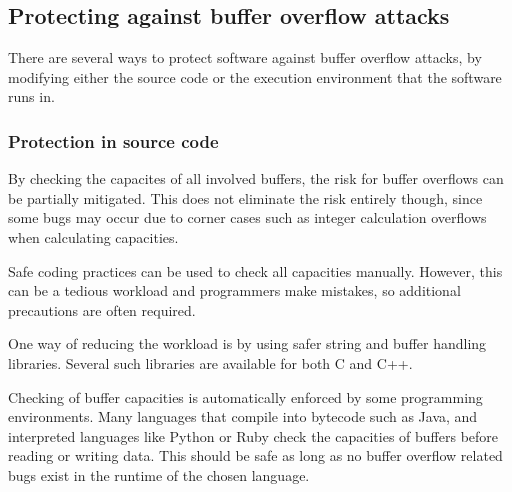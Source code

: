 \subsection{Protecting against buffer overflow attacks}
There are several ways to protect software against buffer overflow attacks,
by modifying either the source code or
the execution environment that the software runs in.

\subsubsection{Protection in source code}
By checking the capacites of all involved buffers,
the risk for buffer overflows can be partially mitigated.
This does not eliminate the risk entirely though,
since some bugs may occur due to corner cases
such as integer calculation overflows when calculating capacities.

Safe coding practices can be used to check all capacities manually.
However, this can be a tedious workload and
programmers make mistakes,
so additional precautions are often required.

One way of reducing the workload is by using
safer string and buffer handling libraries.
Several such libraries are available for both C and C++. 

Checking of buffer capacities is automatically enforced
by some programming environments.
Many languages that compile into bytecode such as Java,
and interpreted languages like Python or Ruby
check the capacities of buffers before reading or writing data.
This should be safe as long as no buffer overflow related bugs exist
in the runtime of the chosen language.
